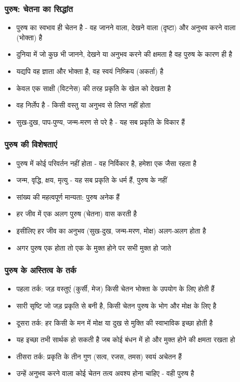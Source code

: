 \begin{frame}[fragile]\frametitle{पुरुष: चेतना का सिद्धांत}
      \begin{itemize}
	\item पुरुष का स्वभाव ही चेतन है - वह जानने वाला, देखने वाला (दृष्टा) और अनुभव करने वाला (भोक्ता) है
	\item दुनिया में जो कुछ भी जानने, देखने या अनुभव करने की क्षमता है वह पुरुष के कारण ही है
	\item यद्यपि वह ज्ञाता और भोक्ता है, वह स्वयं निष्क्रिय (अकर्ता) है
	\item केवल एक साक्षी (विटनेस) की तरह प्रकृति के खेल को देखता है
	\item वह निर्लेप है - किसी वस्तु या अनुभव से लिप्त नहीं होता
	\item सुख-दुख, पाप-पुण्य, जन्म-मरण से परे है - यह सब प्रकृति के विकार हैं
	  \end{itemize}
\end{frame}

\begin{frame}[fragile]\frametitle{पुरुष की विशेषताएं}
      \begin{itemize}
	\item पुरुष में कोई परिवर्तन नहीं होता - वह निर्विकार है, हमेशा एक जैसा रहता है
	\item जन्म, वृद्धि, क्षय, मृत्यु - यह सब प्रकृति के धर्म हैं, पुरुष के नहीं
	\item सांख्य की महत्वपूर्ण मान्यता: पुरुष अनेक हैं
	\item हर जीव में एक अलग पुरुष (चेतना) वास करती है
	\item इसीलिए हर जीव का अनुभव (सुख-दुख, जन्म-मरण, मोक्ष) अलग-अलग होता है
	\item अगर पुरुष एक होता तो एक के मुक्त होने पर सभी मुक्त हो जाते
	  \end{itemize}
\end{frame}

\begin{frame}[fragile]\frametitle{पुरुष के अस्तित्व के तर्क}
      \begin{itemize}
	\item पहला तर्क: जड़ वस्तुएं (कुर्सी, मेज) किसी चेतन भोक्ता के उपयोग के लिए होती हैं
	\item सारी सृष्टि जो जड़ प्रकृति से बनी है, किसी चेतन पुरुष के भोग और मोक्ष के लिए है
	\item दूसरा तर्क: हर किसी के मन में मोक्ष या दुख से मुक्ति की स्वाभाविक इच्छा होती है
	\item यह इच्छा तभी सार्थक हो सकती है जब कोई बंधन में हो और मुक्त होने की क्षमता रखता हो
	\item तीसरा तर्क: प्रकृति के तीन गुण (सत्व, रजस, तमस) स्वयं अचेतन हैं
	\item उन्हें अनुभव करने वाला कोई चेतन तत्व अवश्य होना चाहिए - वही पुरुष है
	  \end{itemize}
\end{frame}

